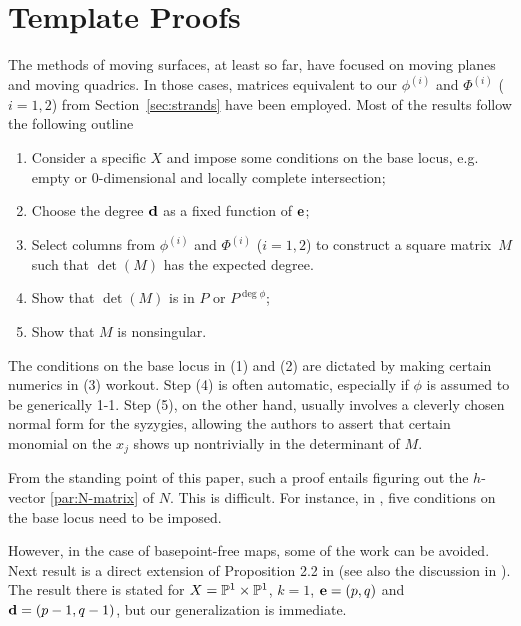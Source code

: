 \documentclass[fleqn,reqno]{amsart}
\begin{document}


\section{Template Proofs}
\label{template-proof}

\begin{paragraf}
\label{par:template-proof}
The methods of moving surfaces, at least so far, have focused on
moving planes and moving quadrics.
In those cases, matrices equivalent to our $\phi^{(i)}$ and $\Phi^{(i)}$ ($i=1,2$)
from Section~\ref{sec:strands} have been employed.
Most of the results follow the following outline
\begin{enumerate}
\item
Consider a specific $X$ and impose some conditions on the base locus,
e.g. empty or 0-dimensional and locally complete intersection;
\item
Choose the degree $\mathbf d$ as a fixed function of $\mathbf e$;
\item
Select columns from $\phi^{(i)}$ and $\Phi^{(i)}$ ($i=1,2$) to construct a square matrix~$M$
such that $\det(M)$ has the expected degree.
\item
Show that $\det(M)$ is in $P$ or $P^{\deg\phi}$;
\item
Show that $M$ is nonsingular.
\end{enumerate}

The conditions on the base locus in (1) and (2) are dictated by
making certain numerics in (3) workout.
Step (4) is often automatic, especially if $\phi$ is assumed to be generically 1-1.
Step (5), on the other hand, usually involves a cleverly chosen normal form for the syzygies,
allowing the authors to assert that certain monomial on the $x_j$ shows up nontrivially
in the determinant of $M$.
\end{paragraf}

\begin{paragraf}
From the standing point of this paper, such a proof entails
figuring out the $h$-vector \eqref{par:N-matrix} of $N$.
This is difficult.
For instance, in \citet{BCD-03},
five conditions on the base locus need to be imposed.
\end{paragraf}

\begin{paragraf*}
However, in the case of basepoint-free maps, some of the work can be avoided.
Next result is a direct extension of Proposition 2.2 in \citet{CGZ-00}
(see also the discussion in \citet{Cox-01}).
The result there is stated for $X=\mathbb{P}^1\times\mathbb{P}^1$, $k=1$, $\mathbf e=(p,q)$ and $\mathbf d=(p-1,q-1)$,
but our generalization is immediate.
\end{paragraf*}
\end{document}
